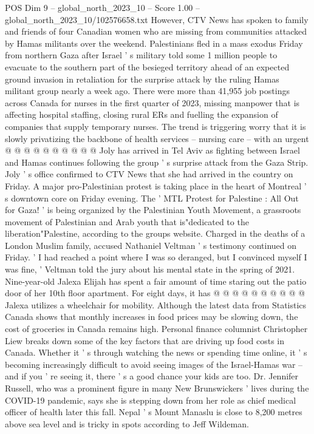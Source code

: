 \begin{textsample}{POS Dim 9 – global\_north\_2023\_10 – Score 1.00 – global\_north\_2023\_10/102576658.txt}
However, CTV News has spoken to family and friends of four Canadian women who are missing from communities attacked by Hamas militants over the weekend.
Palestinians fled in a mass exodus Friday from northern Gaza after Israel ' s military told some 1 million people to evacuate to the southern part of the besieged territory ahead of an expected ground invasion in retaliation for the surprise attack by the ruling Hamas militant group nearly a week ago.
There were more than 41,955 job postings across Canada for nurses in the first quarter of 2023, missing manpower that is affecting hospital staffing, closing rural ERs and fuelling the expansion of companies that supply temporary nurses.
The trend is triggering worry that it is slowly privatizing the backbone of health services -- nursing care -- with an urgent @ @ @ @ @ @ @ @ @ @ Joly has arrived in Tel Aviv as fighting between Israel and Hamas continues following the group ' s surprise attack from the Gaza Strip.
Joly ' s office confirmed to CTV News that she had arrived in the country on Friday.
A major pro-Palestinian protest is taking place in the heart of Montreal ' s downtown core on Friday evening.
The ' MTL Protest for Palestine : All Out for Gaza! ' is being organized by the Palestinian Youth Movement, a grassroots movement of Palestinian and Arab youth that is"dedicated to the liberation"Palestine, according to the groups website.
Charged in the deaths of a London Muslim family, accused Nathaniel Veltman ' s testimony continued on Friday. ' I had reached a point where I was so deranged, but I convinced myself I was fine, ' Veltman told the jury about his mental state in the spring of 2021.
Nine-year-old Jalexa Elijah has spent a fair amount of time staring out the patio door of her 10th floor apartment.
For eight days, it has @ @ @ @ @ @ @ @ @ @ Jalexa utilizes a wheelchair for mobility.
Although the latest data from Statistics Canada shows that monthly increases in food prices may be slowing down, the cost of groceries in Canada remains high.
Personal finance columnist Christopher Liew breaks down some of the key factors that are driving up food costs in Canada.
Whether it ' s through watching the news or spending time online, it ' s becoming increasingly difficult to avoid seeing images of the Israel-Hamas war -- and if you ' re seeing it, there ' s a good chance your kids are too.
Dr.
Jennifer Russell, who was a prominent figure in many New Brunswickers ' lives during the COVID-19 pandemic, says she is stepping down from her role as chief medical officer of health later this fall.
Nepal ' s Mount Manaslu is close to 8,200 metres above sea level and is tricky in spots according to Jeff Wildeman.

\end{textsample}
